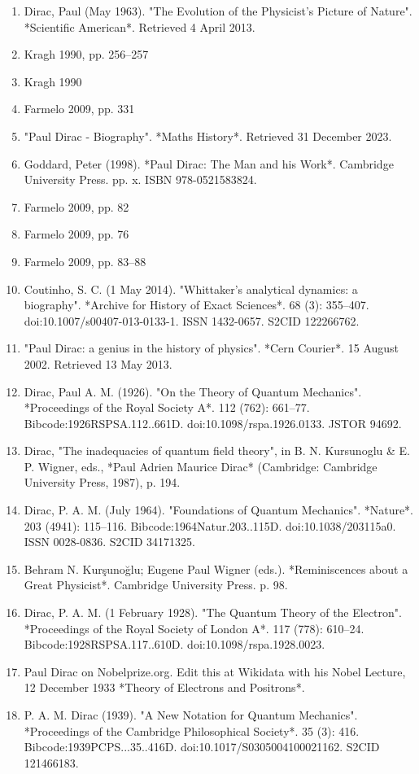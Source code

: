 \begin{enumerate}
\item Dirac, Paul (May 1963). "The Evolution of the Physicist's Picture of Nature". *Scientific American*. Retrieved 4 April 2013.
\item Kragh 1990, pp. 256–257
\item Kragh 1990
\item Farmelo 2009, pp. 331
\item "Paul Dirac - Biography". *Maths History*. Retrieved 31 December 2023.
\item Goddard, Peter (1998). *Paul Dirac: The Man and his Work*. Cambridge University Press. pp. x. ISBN 978-0521583824.
\item Farmelo 2009, pp. 82
\item Farmelo 2009, pp. 76
\item Farmelo 2009, pp. 83–88
\item Coutinho, S. C. (1 May 2014). "Whittaker's analytical dynamics: a biography". *Archive for History of Exact Sciences*. 68 (3): 355–407. doi:10.1007/s00407-013-0133-1. ISSN 1432-0657. S2CID 122266762.
\item "Paul Dirac: a genius in the history of physics". *Cern Courier*. 15 August 2002. Retrieved 13 May 2013.
\item Dirac, Paul A. M. (1926). "On the Theory of Quantum Mechanics". *Proceedings of the Royal Society A*. 112 (762): 661–77. Bibcode:1926RSPSA.112..661D. doi:10.1098/rspa.1926.0133. JSTOR 94692.
\item Dirac, "The inadequacies of quantum field theory", in B. N. Kursunoglu & E. P. Wigner, eds., *Paul Adrien Maurice Dirac* (Cambridge: Cambridge University Press, 1987), p. 194.
\item Dirac, P. A. M. (July 1964). "Foundations of Quantum Mechanics". *Nature*. 203 (4941): 115–116. Bibcode:1964Natur.203..115D. doi:10.1038/203115a0. ISSN 0028-0836. S2CID 34171325.
\item Behram N. Kurşunoğlu; Eugene Paul Wigner (eds.). *Reminiscences about a Great Physicist*. Cambridge University Press. p. 98.
\item Dirac, P. A. M. (1 February 1928). "The Quantum Theory of the Electron". *Proceedings of the Royal Society of London A*. 117 (778): 610–24. Bibcode:1928RSPSA.117..610D. doi:10.1098/rspa.1928.0023.
\item Paul Dirac on Nobelprize.org. Edit this at Wikidata with his Nobel Lecture, 12 December 1933 *Theory of Electrons and Positrons*.
\item P. A. M. Dirac (1939). "A New Notation for Quantum Mechanics". *Proceedings of the Cambridge Philosophical Society*. 35 (3): 416. Bibcode:1939PCPS...35..416D. doi:10.1017/S0305004100021162. S2CID 121466183.

\end{enumerate}
